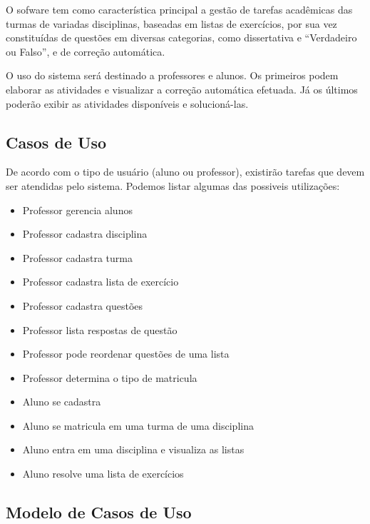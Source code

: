 \documentclass[12pt,letterpaper]{article}
\begin{document}
O sofware tem como característica principal a gestão de tarefas acadêmicas das turmas de variadas disciplinas, baseadas em listas de exercícios, por sua vez constituídas de questões em diversas categorias, como dissertativa e ``Verdadeiro ou Falso'', e de correção automática.

O uso do sistema será destinado a professores e alunos. Os primeiros podem elaborar as atividades e visualizar a correção automática efetuada. Já os últimos poderão exibir as atividades disponíveis e solucioná-las.



\pagebreak
\subsection{Casos de Uso}
De acordo com o tipo de usuário (aluno ou professor), existirão tarefas que devem ser atendidas pelo sistema. Podemos listar algumas das possiveis utilizações:
\begin{itemize}
\item {Professor gerencia alunos}
\item {Professor cadastra disciplina}
\item {Professor cadastra turma}
\item {Professor cadastra lista de exercício}
\item {Professor cadastra questões}
\item {Professor lista respostas de questão}
\item {Professor pode reordenar questões de uma lista}
\item {Professor determina o tipo de matricula}
\item {Aluno se cadastra}
\item {Aluno se matricula em uma turma de uma disciplina}
\item {Aluno entra em uma disciplina e visualiza as listas}
\item {Aluno resolve uma lista de exercícios}
\end{itemize}


\pagebreak
\subsection{Modelo de Casos de Uso}
\end{document}
